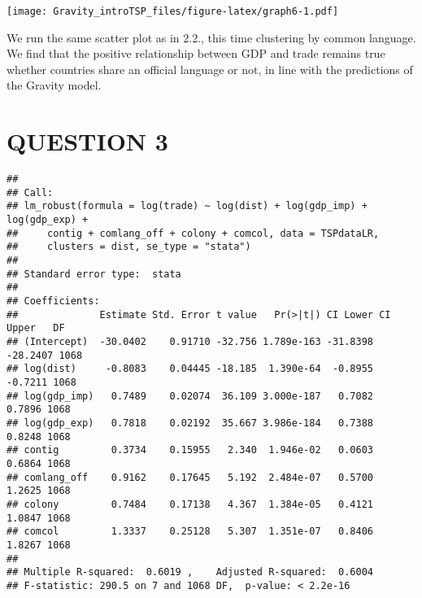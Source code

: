 \documentclass[
]{article}
\newenvironment{Shaded}{\begin{snugshade}}{\end{snugshade}}
\newcommand{\AttributeTok}[1]{\textcolor[rgb]{0.77,0.63,0.00}{#1}}
\newcommand{\CommentTok}[1]{\textcolor[rgb]{0.56,0.35,0.01}{\textit{#1}}}
\newcommand{\DecValTok}[1]{\textcolor[rgb]{0.00,0.00,0.81}{#1}}
\newcommand{\FunctionTok}[1]{\textcolor[rgb]{0.00,0.00,0.00}{#1}}
\newcommand{\NormalTok}[1]{#1}
\newcommand{\OtherTok}[1]{\textcolor[rgb]{0.56,0.35,0.01}{#1}}
\newcommand{\SpecialCharTok}[1]{\textcolor[rgb]{0.00,0.00,0.00}{#1}}
\newcommand{\StringTok}[1]{\textcolor[rgb]{0.31,0.60,0.02}{#1}}
\begin{document}
\texttt{[image: Gravity\_introTSP\_files/figure-latex/graph6-1.pdf]}

We run the same scatter plot as in 2.2., this time clustering by common
language. We find that the positive relationship between GDP and trade
remains true whether countries share an official language or not, in
line with the predictions of the Gravity model.

\hypertarget{question-3}{%
\section{QUESTION 3}\label{question-3}}

\begin{Shaded}
\end{Shaded}

\begin{verbatim}
## 
## Call:
## lm_robust(formula = log(trade) ~ log(dist) + log(gdp_imp) + log(gdp_exp) + 
##     contig + comlang_off + colony + comcol, data = TSPdataLR, 
##     clusters = dist, se_type = "stata")
## 
## Standard error type:  stata 
## 
## Coefficients:
##              Estimate Std. Error t value   Pr(>|t|) CI Lower CI Upper   DF
## (Intercept)  -30.0402    0.91710 -32.756 1.789e-163 -31.8398 -28.2407 1068
## log(dist)     -0.8083    0.04445 -18.185  1.390e-64  -0.8955  -0.7211 1068
## log(gdp_imp)   0.7489    0.02074  36.109 3.000e-187   0.7082   0.7896 1068
## log(gdp_exp)   0.7818    0.02192  35.667 3.986e-184   0.7388   0.8248 1068
## contig         0.3734    0.15955   2.340  1.946e-02   0.0603   0.6864 1068
## comlang_off    0.9162    0.17645   5.192  2.484e-07   0.5700   1.2625 1068
## colony         0.7484    0.17138   4.367  1.384e-05   0.4121   1.0847 1068
## comcol         1.3337    0.25128   5.307  1.351e-07   0.8406   1.8267 1068
## 
## Multiple R-squared:  0.6019 ,    Adjusted R-squared:  0.6004 
## F-statistic: 290.5 on 7 and 1068 DF,  p-value: < 2.2e-16
\end{verbatim}
\end{document}
